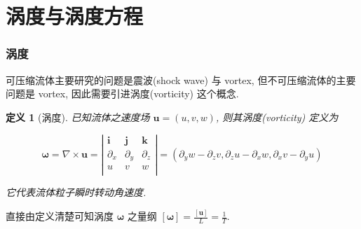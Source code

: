 \documentclass[aspectratio=2516]{beamer}
\newtheorem{defi}{\kaishu 定义}
\begin{document}



\section{\kaishu  涡度与涡度方程}


\begin{frame}
\frametitle{\kaishu 涡度} 

\kaishu 

可压缩流体主要研究的问题是震波(shock wave) 与 vortex, 但不可压缩流体的主要问题是 vortex, 因此需要引进涡度(vorticity) 这个概念.

\begin{defi}[\kaishu 涡度]
	\kaishu 
	已知流体之速度场 $\boldsymbol{u} = \left( {u,v,w} \right)$, 则其涡度(vorticity) 定义为
	
	\begin{equation}
	\boldsymbol{\omega} = \nabla \times \boldsymbol{u} = \left| {\begin{matrix}
		\boldsymbol{i} & \boldsymbol{j} & \boldsymbol{k}  \\ 
		{{\partial _x}} & {{\partial _y}} & {{\partial _z}}  \\ 
		u & v & w  \\ 
		\end{matrix} } \right| = \left( {{\partial _y}w - {\partial _z}v,{\partial _z}u - {\partial _x}w,{\partial _x}v - {\partial _y}u} \right)
	\label{eq5.3.1}
	\end{equation}
	
	它代表流体粒子瞬时转动角速度.
	\label{def5.3.1}	
\end{defi}

直接由定义清楚可知涡度 $ \boldsymbol{\omega} $ 之量纲 $\left[ \boldsymbol{\omega}  \right] = \frac{{\left[ \boldsymbol{u} \right]}}{L} = \frac{1}{T}$.

\end{frame}

\end{document}
